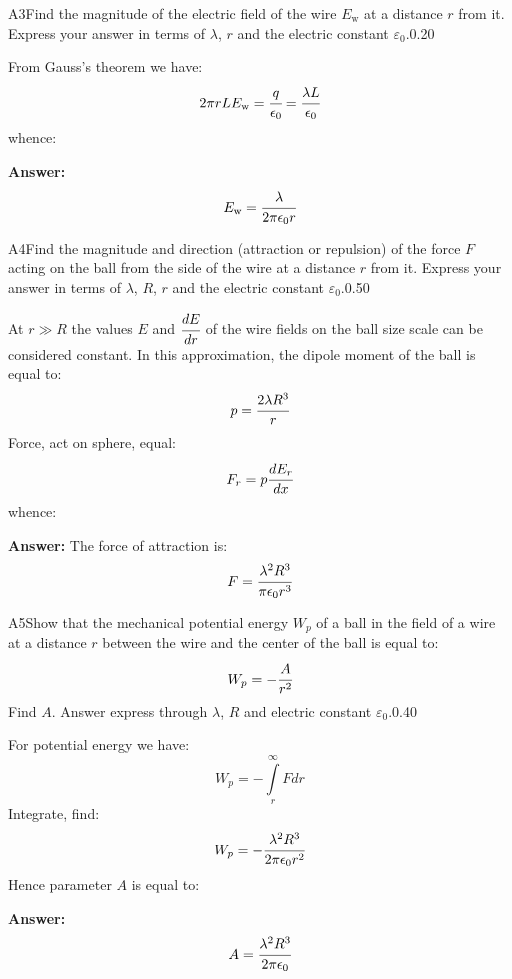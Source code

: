\documentclass[11pt,a4paper]{article}
\begin{document}
\begin{solcard}{A3}{Find the magnitude of the electric field of the wire $E_\text{w}$ at a distance $r$ from it. Express your answer in terms of $\lambda$, $r$ and the electric constant $\varepsilon_0$.}{0.20}

From Gauss's theorem we have: $$2\pi rLE_\text{w}=\cfrac{q}{\epsilon_0}=\cfrac{\lambda L}{\epsilon_0} $$ whence:

\par\smallskip\noindent\textbf{Answer:} $$E_\text{w}=\cfrac{\lambda}{2\pi\epsilon_0 r} $$
\end{solcard}

\begin{solcard}{A4}{Find the magnitude and direction (attraction or repulsion) of the force $F$ acting on the ball from the side of the wire at a distance $r$ from it. Express your answer in terms of $\lambda$, $R$, $r$ and the electric constant $\varepsilon_0$.}{0.50}

At $r\gg{R}$ the values $E$ and $\cfrac{dE}{dr}$ of the wire fields on the ball size scale can be considered constant. In this approximation, the dipole moment of the ball is equal to: $$p=\cfrac{2\lambda R^3}{r} $$ Force, act on sphere, equal: $$F_r=p\cfrac{dE_r}{dx} $$ whence:

\par\smallskip\noindent\textbf{Answer:} The force of attraction is: $$F=\cfrac{\lambda^2R^3}{\pi\epsilon_0r^3} $$
\end{solcard}

\begin{solcard}{A5}{Show that the mechanical potential energy $W_p$ of a ball in the field of a wire at a distance $r$ between the wire and the center of the ball is equal to: $$W_p=-\cfrac{A}{r^2} $$ Find $A$. Answer express through $\lambda$, $R$ and electric constant $\varepsilon_0$.}{0.40}

For potential energy we have: $$W_p=-\int\limits_r^{\infty}Fdr $$ Integrate, find: $$W_p=-\cfrac{\lambda^2R^3}{2\pi\epsilon_0r^2} $$ Hence parameter $A$ is equal to:

\par\smallskip\noindent\textbf{Answer:} $$A=\cfrac{\lambda^2R^3}{2\pi\epsilon_0} $$
\end{solcard}
\end{document}
